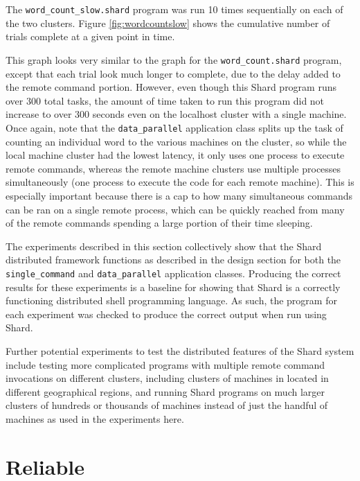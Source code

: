 \documentclass[oneside]{report}
\begin{document}
The \texttt{word\_count\_slow.shard} program was run 10 times sequentially on each of the two clusters.
Figure \ref{fig:wordcountslow} shows the cumulative number of trials complete at a given point in time.

This graph looks very similar to the graph for the \texttt{word\_count.shard} program, except that each trial look much longer to complete, due to the delay added to the remote command portion.
However, even though this Shard program runs over 300 total tasks, the amount of time taken to run this program did not increase to over 300 seconds even on the localhost cluster with a single machine.
Once again, note that the \texttt{data\_parallel} application class splits up the task of counting an individual word to the various machines on the cluster, so while the local machine cluster had the lowest latency, it only uses one process to execute remote commands, whereas the remote machine clusters use multiple processes simultaneously (one process to execute the code for each remote machine).
This is especially important because there is a cap to how many simultaneous commands can be ran on a single remote process, which can be quickly reached from many of the remote commands spending a large portion of their time sleeping.

The experiments described in this section collectively show that the Shard distributed framework functions as described in the design section for both the \texttt{single\_command} and \texttt{data\_parallel} application classes.
Producing the correct results for these experiments is a baseline for showing that Shard is a correctly functioning distributed shell programming language.
As such, the program for each experiment was checked to produce the correct output when run using Shard.

Further potential experiments to test the distributed features of the Shard system include testing more complicated programs with multiple remote command invocations on different clusters, including clusters of machines in located in different geographical regions, and running Shard programs on much larger clusters of hundreds or thousands of machines instead of just the handful of machines as used in the experiments here.

\section{Reliable}
\end{document}

